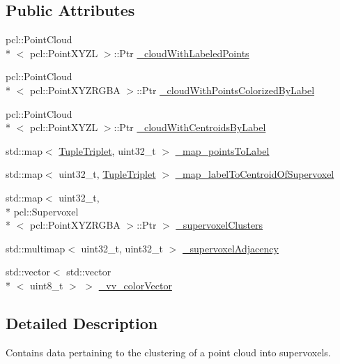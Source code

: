 \subsection*{Public Attributes}
\begin{DoxyCompactItemize}
\item 
pcl\-::\-Point\-Cloud\\*
$<$ pcl\-::\-Point\-X\-Y\-Z\-L $>$\-::Ptr \hyperlink{classSupervoxelDataContainer_a273723386c6419c2e22fc4a82d708faa}{\-\_\-cloud\-With\-Labeled\-Points}
\item 
pcl\-::\-Point\-Cloud\\*
$<$ pcl\-::\-Point\-X\-Y\-Z\-R\-G\-B\-A $>$\-::Ptr \hyperlink{classSupervoxelDataContainer_a850060193389a623dcb8600eee8e4d54}{\-\_\-cloud\-With\-Points\-Colorized\-By\-Label}
\item 
pcl\-::\-Point\-Cloud\\*
$<$ pcl\-::\-Point\-X\-Y\-Z\-L $>$\-::Ptr \hyperlink{classSupervoxelDataContainer_ae3c91d4f8e5a4c8511dac692a1c8dd6f}{\-\_\-cloud\-With\-Centroids\-By\-Label}
\item 
std\-::map$<$ \hyperlink{tupleTriplet_8h_a0cdd11cd4d27abbb7b778a8fee3b2397}{Tuple\-Triplet}, uint32\-\_\-t $>$ \hyperlink{classSupervoxelDataContainer_a4fd7af5a22476fc212394a9fdd869f98}{\-\_\-map\-\_\-points\-To\-Label}
\item 
std\-::map$<$ uint32\-\_\-t, \hyperlink{tupleTriplet_8h_a0cdd11cd4d27abbb7b778a8fee3b2397}{Tuple\-Triplet} $>$ \hyperlink{classSupervoxelDataContainer_a0021bdaa8ddf908922afa29911a0f5eb}{\-\_\-map\-\_\-label\-To\-Centroid\-Of\-Supervoxel}
\item 
std\-::map$<$ uint32\-\_\-t, \\*
pcl\-::\-Supervoxel\\*
$<$ pcl\-::\-Point\-X\-Y\-Z\-R\-G\-B\-A $>$\-::Ptr $>$ \hyperlink{classSupervoxelDataContainer_a93773d70194fdb465f29cd4aa5aacb6d}{\-\_\-supervoxel\-Clusters}
\item 
std\-::multimap$<$ uint32\-\_\-t, uint32\-\_\-t $>$ \hyperlink{classSupervoxelDataContainer_a5730592d6b01b4770f65ab274901505f}{\-\_\-supervoxel\-Adjacency}
\item 
std\-::vector$<$ std\-::vector\\*
$<$ uint8\-\_\-t $>$ $>$ \hyperlink{classSupervoxelDataContainer_abc7ed8d684b58d402c37e83a590469f5}{\-\_\-vv\-\_\-color\-Vector}
\end{DoxyCompactItemize}


\subsection{Detailed Description}
Contains data pertaining to the clustering of a point cloud into supervoxels. 

